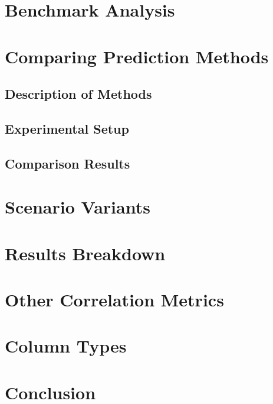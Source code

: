 \documentclass[
  11pt,
  authoryear,
  preprint]{elsarticle}
\begin{document}
\section{Benchmark Analysis}\label{benchmark-analysis}

\section{Comparing Prediction
Methods}\label{comparing-prediction-methods}

\subsection{Description of Methods}\label{description-of-methods}

\subsection{Experimental Setup}\label{experimental-setup}

\subsection{Comparison Results}\label{comparison-results}

\section{Scenario Variants}\label{scenario-variants}

\section{Results Breakdown}\label{results-breakdown}

\section{Other Correlation Metrics}\label{other-correlation-metrics}

\section{Column Types}\label{column-types}

\section{Conclusion}\label{conclusion}


\renewcommand\refname{References}
  
\end{document}
